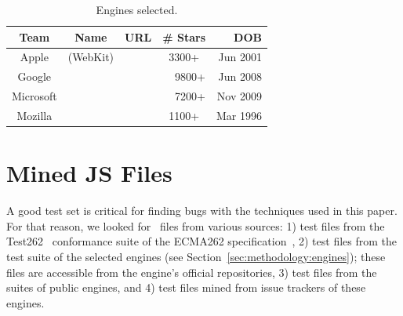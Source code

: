 \documentclass[smallextended]{svjour3}
\begin{document}
\begin{table}[t]
  \small
  \centering
  \caption{\label{tab:engines}Engines selected.}
  \begin{tabular}{cccrr}
    \toprule
    Team & Name & URL & \# Stars  & DOB \\
    \midrule
    Apple & \jsc{} (WebKit) & \cite{jsc2018repo} &
    \multicolumn{1}{c}{3300+} & Jun 2001\\
    Google & \veight{} & \cite{v82018repo} & 9800+ & Jun 2008\\
    Microsoft & \chakra{} & \cite{chakra2018repo} & 7200+ & Nov 2009\\
    Mozilla & \smonkey{} & \cite{spidermonkey2018repo} &
    \multicolumn{1}{c}{1100+} & Mar 1996\\
   \bottomrule
  \end{tabular}
\end{table}

\section{Mined JS Files}
\label{sec:seeds}
A good test set is critical for finding bugs with the techniques used
in this paper. For that reason, we looked for \js\ files from various
sources: 1) test files from the Test262~\cite{tc39-github} conformance
suite of the ECMA262 specification~\cite{ecmas262-spec}, 2) test files
from the test suite of the selected engines (see
Section~\ref{sec:methodology:engines}); these files are accessible
from the engine's official repositories, 3) test files from the suites
of public engines, and 4) test files mined from issue trackers of
these engines.

\end{document}
